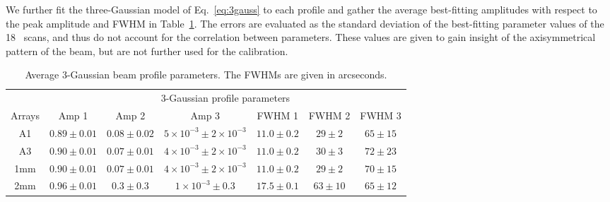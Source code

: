 We further fit the three-Gaussian model of Eq.~\ref{eq:3gauss} to each
profile and gather the average best-fitting amplitudes with respect to
the peak amplitude and FWHM in Table~\ref{tab:mean_3gauss_fit}. The
errors are evaluated as the standard deviation of the best-fitting
parameter values of the 18 \bm\ scans, and thus do not account for the
correlation between parameters. These values are given to gain insight
of the axisymmetrical pattern of the beam, but are not further used for
the calibration. 


\begin{table}[th]
  \begin{center}
    \begin{tabular}{|c|c|c|c|c|c|c|}
      \hline
      & \multicolumn{6}{|c|}{3-Gaussian profile parameters}  \\\cline{1-7}
      Arrays       & Amp 1 & Amp 2 & Amp 3 & FWHM 1 & FWHM 2 & FWHM 3 \\
      \hline\hline
      A1        &  $0.89 \pm 0.01$   &  $0.08 \pm 0.02$  & $5 \times 10^{-3} \pm 2 \times 10^{-3}$  &  $11.0 \pm 0.2 $ & $29 \pm 2 $  & $65 \pm 15 $ \\  
      A3        &  $0.90 \pm 0.01$   &  $0.07 \pm 0.01$  & $4 \times 10^{-3} \pm 2 \times 10^{-3}$  &  $11.0 \pm 0.2 $ & $30 \pm 3 $  & $72 \pm 23 $ \\  
      1mm       &  $0.90 \pm 0.01$   &  $0.07 \pm 0.01$  & $4 \times 10^{-3} \pm 2 \times 10^{-3}$  &  $11.0 \pm 0.2 $ & $29 \pm 2 $  & $70 \pm 15 $ \\  
      2mm       &  $0.96 \pm 0.01$   &  $0.3 \pm 0.3$    & $1 \times 10^{-3} \pm 0.3$ &  $17.5 \pm 0.1 $ & $63 \pm 10 $ & $65 \pm 12 $ \\  
      \hline\hline
    \end{tabular}
    \caption[Average 3-Gaussian beam profile parameters]{Average
      3-Gaussian beam profile parameters. The FWHMs are given in arcseconds.}
    \label{tab:mean_3gauss_fit}
  \end{center}
\end{table}
